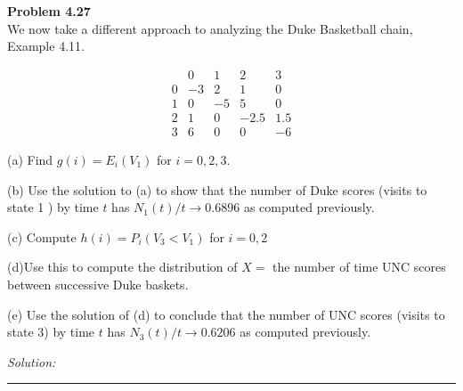 \documentclass[a4paper, 11pt]{article}
\newenvironment{problem}[2][Problem]
    { \begin{mdframed}[backgroundcolor=gray!20] \textbf{#1 #2} \\}
    {  \end{mdframed}}
\newenvironment{solution}
    {\textit{Solution:}}
    {}
\begin{document}
\begin{problem}{4.27}
We now take a different approach to analyzing the Duke Basketball chain, Example 4.11.

$$
\begin{array}{ccccc} 
& 0 & 1 & 2 & 3 \\
0 & -3 & 2 & 1 & 0 \\
1 & 0 & -5 & 5 & 0 \\
2 & 1 & 0 & -2.5 & 1.5 \\
3 & 6 & 0 & 0 & -6
\end{array}
$$

(a) Find $g(i)=E_{i}\left(V_{1}\right)$ for $i=0,2,3 .$ 

(b) Use the solution to (a) to show that the number of Duke scores (visits to state 1 ) by time $t$ has $N_{1}(t) / t \rightarrow 0.6896$ as computed previously. 

(c) Compute $h(i)=P_{i}\left(V_{3}<V_{1}\right)$ for $i=0,2$ 

(d)Use this to compute the distribution of $X=$ the number of time UNC scores between successive Duke baskets. 

(e) Use the solution of (d) to conclude that the number of UNC scores (visits to state 3) by time $t$ has $N_{3}(t) / t \rightarrow 0.6206$ as computed previously.

\end{problem}
\begin{solution}


\end{solution} 
%
\noindent\rule{7in}{2.8pt}
\end{document}
